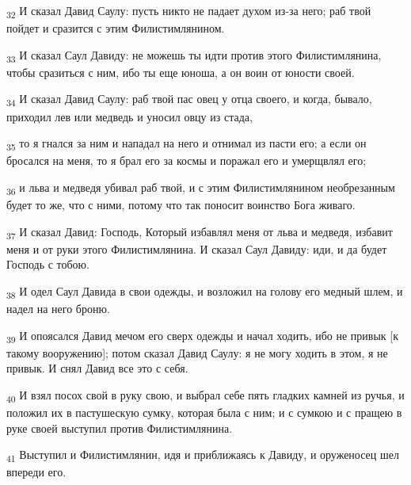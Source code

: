 \begin{tcolorbox}
\textsubscript{32} И сказал Давид Саулу: пусть никто не падает духом из-за него; раб твой пойдет и сразится с этим Филистимлянином.
\end{tcolorbox}
\begin{tcolorbox}
\textsubscript{33} И сказал Саул Давиду: не можешь ты идти против этого Филистимлянина, чтобы сразиться с ним, ибо ты еще юноша, а он воин от юности своей.
\end{tcolorbox}
\begin{tcolorbox}
\textsubscript{34} И сказал Давид Саулу: раб твой пас овец у отца своего, и когда, бывало, приходил лев или медведь и уносил овцу из стада,
\end{tcolorbox}
\begin{tcolorbox}
\textsubscript{35} то я гнался за ним и нападал на него и отнимал из пасти его; а если он бросался на меня, то я брал его за космы и поражал его и умерщвлял его;
\end{tcolorbox}
\begin{tcolorbox}
\textsubscript{36} и льва и медведя убивал раб твой, и с этим Филистимлянином необрезанным будет то же, что с ними, потому что так поносит воинство Бога живаго.
\end{tcolorbox}
\begin{tcolorbox}
\textsubscript{37} И сказал Давид: Господь, Который избавлял меня от льва и медведя, избавит меня и от руки этого Филистимлянина. И сказал Саул Давиду: иди, и да будет Господь с тобою.
\end{tcolorbox}
\begin{tcolorbox}
\textsubscript{38} И одел Саул Давида в свои одежды, и возложил на голову его медный шлем, и надел на него броню.
\end{tcolorbox}
\begin{tcolorbox}
\textsubscript{39} И опоясался Давид мечом его сверх одежды и начал ходить, ибо не привык [к такому вооружению]; потом сказал Давид Саулу: я не могу ходить в этом, я не привык. И снял Давид все это с себя.
\end{tcolorbox}
\begin{tcolorbox}
\textsubscript{40} И взял посох свой в руку свою, и выбрал себе пять гладких камней из ручья, и положил их в пастушескую сумку, которая была с ним; и с сумкою и с пращею в руке своей выступил против Филистимлянина.
\end{tcolorbox}
\begin{tcolorbox}
\textsubscript{41} Выступил и Филистимлянин, идя и приближаясь к Давиду, и оруженосец шел впереди его.
\end{tcolorbox}
